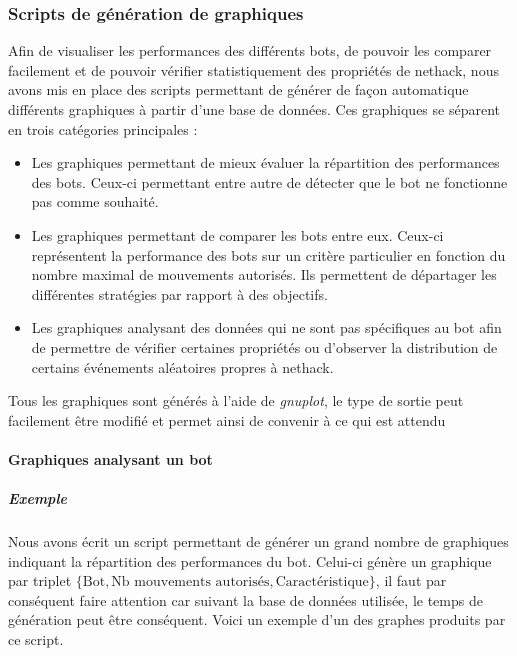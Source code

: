\documentclass[a4paper,12pt]{article}
\begin{document}
\subsubsection{Scripts de génération de graphiques}

Afin de visualiser les performances des différents bots, de pouvoir les comparer
facilement et de pouvoir vérifier statistiquement des propriétés de nethack,
nous avons mis en place des scripts permettant de générer de façon automatique
différents graphiques à partir d'une base de données. Ces graphiques se séparent
en trois catégories principales :
\begin{itemize}
\item Les graphiques permettant de mieux évaluer la répartition des performances
  des bots. Ceux-ci permettant entre autre de détecter que le bot ne fonctionne
  pas comme souhaité.
\item Les graphiques permettant de comparer les bots entre eux. Ceux-ci
  représentent la performance des bots sur un critère particulier en fonction du
  nombre maximal de mouvements autorisés. Ils permettent de départager les
  différentes stratégies par rapport à des objectifs.
\item Les graphiques analysant des données qui ne sont pas spécifiques au bot
  afin de permettre de vérifier certaines propriétés ou d'observer la
  distribution de certains événements aléatoires propres à nethack.
\end{itemize}
Tous les graphiques sont générés à l'aide de {\em gnuplot}, le type de sortie
peut facilement être modifié et permet ainsi de convenir à ce qui est attendu

\paragraph{Graphiques analysant un bot}

\subparagraph{Exemple}
Nous avons écrit un script permettant de générer un grand nombre de graphiques
indiquant la répartition des performances du bot. Celui-ci génère un graphique
par triplet
$\{\text{Bot},\text{Nb mouvements autorisés},\text{Caractéristique} \}$, il
faut par conséquent faire attention car suivant la base de données utilisée,
le temps de génération peut être conséquent. Voici un exemple d'un des graphes
produits par ce script.
\end{document}

